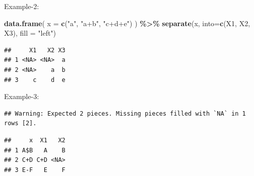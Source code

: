 \documentclass[
]{book}
\newenvironment{Shaded}{\begin{snugshade}}{\end{snugshade}}
\newcommand{\AttributeTok}[1]{\textcolor[rgb]{0.13,0.29,0.53}{#1}}
\newcommand{\ConstantTok}[1]{\textcolor[rgb]{0.56,0.35,0.01}{#1}}
\newcommand{\FunctionTok}[1]{\textcolor[rgb]{0.13,0.29,0.53}{\textbf{#1}}}
\newcommand{\NormalTok}[1]{#1}
\newcommand{\SpecialCharTok}[1]{\textcolor[rgb]{0.81,0.36,0.00}{\textbf{#1}}}
\newcommand{\StringTok}[1]{\textcolor[rgb]{0.31,0.60,0.02}{#1}}
\begin{document}
Example-2:

\begin{Shaded}
\begin{Highlighting}[]
\FunctionTok{data.frame}\NormalTok{(}
  \AttributeTok{x =} \FunctionTok{c}\NormalTok{(}\StringTok{"a"}\NormalTok{, }\StringTok{"a+b"}\NormalTok{, }\StringTok{"c+d+e"}\NormalTok{)}
\NormalTok{) }\SpecialCharTok{\%\textgreater{}\%} 
  \FunctionTok{separate}\NormalTok{(x,}
           \AttributeTok{into=}\FunctionTok{c}\NormalTok{(}\StringTok{\textquotesingle{}X1\textquotesingle{}}\NormalTok{, }\StringTok{\textquotesingle{}X2\textquotesingle{}}\NormalTok{, }\StringTok{\textquotesingle{}X3\textquotesingle{}}\NormalTok{),}
           \AttributeTok{fill =} \StringTok{"left"}\NormalTok{)}
\end{Highlighting}
\end{Shaded}

\begin{verbatim}
##     X1   X2 X3
## 1 <NA> <NA>  a
## 2 <NA>    a  b
## 3    c    d  e
\end{verbatim}

Example-3:

\begin{Shaded}
\end{Shaded}

\begin{verbatim}
## Warning: Expected 2 pieces. Missing pieces filled with `NA` in 1 rows [2].
\end{verbatim}

\begin{verbatim}
##     x  X1   X2
## 1 A$B   A    B
## 2 C+D C+D <NA>
## 3 E-F   E    F
\end{verbatim}
\end{document}
